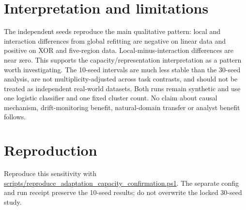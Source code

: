 \documentclass[10pt]{article}
\begin{document}
\section{Interpretation and limitations}
The independent seeds reproduce the main qualitative pattern: local and interaction differences from global refitting are negative on linear data and positive on XOR and five-region data. Local-minus-interaction differences are near zero. This supports the capacity/representation interpretation as a pattern worth investigating. The 10-seed intervals are much less stable than the 30-seed analysis, are not multiplicity-adjusted across task contrasts, and should not be treated as independent real-world datasets. Both runs remain synthetic and use one logistic classifier and one fixed cluster count. No claim about causal mechanism, drift-monitoring benefit, natural-domain transfer or analyst benefit follows.
\section{Reproduction}
Reproduce this sensitivity with {\small\url{scripts/reproduce_adaptation_capacity_confirmation.ps1}}. The separate config and run receipt preserve the 10-seed results; do not overwrite the locked 30-seed study.
\end{document}
